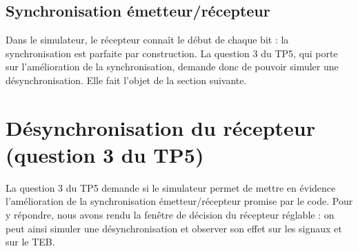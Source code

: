 \documentclass[11pt,a4paper]{article}
\begin{document}
\subsection{Synchronisation émetteur/récepteur}
Dans le simulateur, le récepteur connaît le début de chaque bit : la synchronisation est parfaite par construction. La question 3 du TP5, qui porte sur l'amélioration de la synchronisation, demande donc de pouvoir simuler une désynchronisation. Elle fait l'objet de la section suivante.

\section{Désynchronisation du récepteur (question 3 du TP5)}\label{sec:desync}
La question 3 du TP5 demande si le simulateur permet de mettre en évidence l'amélioration de la synchronisation émetteur/récepteur promise par le code. Pour y répondre, nous avons rendu la fenêtre de décision du récepteur réglable : on peut ainsi simuler une désynchronisation et observer son effet sur les signaux et sur le TEB.
\end{document}
